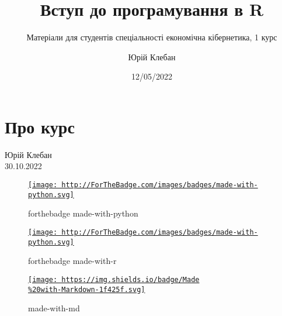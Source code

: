 \documentclass[
  letterpaper,
  DIV=11,
  numbers=noendperiod]{scrreprt}
\title{Вступ до програмування в R}
\subtitle{Матеріали для студентів спеціальності економічна кібернетика,
1 курс}
\author{Юрій Клебан}
\date{12/05/2022}
\renewcommand*\contentsname{Зміст}
\newcommand\contentsname{Зміст}
\begin{document}
\maketitle
\ifdefined\Shaded\renewenvironment{Shaded}{\begin{tcolorbox}[breakable, interior hidden, boxrule=0pt, enhanced, borderline west={3pt}{0pt}{shadecolor}, sharp corners, frame hidden]}{\end{tcolorbox}}\fi

\renewcommand*\contentsname{Зміст}
{
\hypersetup{linkcolor=}
\setcounter{tocdepth}{2}
\tableofcontents
}

\hypertarget{ux43fux440ux43e-ux43aux443ux440ux441}{%
\chapter*{Про курс}\label{ux43fux440ux43e-ux43aux443ux440ux441}}

Юрій Клебан\\
30.10.2022

\hfill\break

\begin{figure}

{\centering 

\href{https://www.python.org/}{\texttt{[image: http://ForTheBadge.com/images/badges/made-with-python.svg]}}

}

\caption{forthebadge made-with-python}

\end{figure}

\begin{figure}

{\centering 

\href{https://www.python.org/}{\texttt{[image: http://ForTheBadge.com/images/badges/made-with-python.svg]}}

}

\caption{forthebadge made-with-r}

\end{figure}

\begin{figure}

{\centering 

\href{http://commonmark.org}{\texttt{[image: https://img.shields.io/badge/Made\\\%20with-Markdown-1f425f.svg]}}

}

\caption{made-with-md}

\end{figure}
\end{document}
